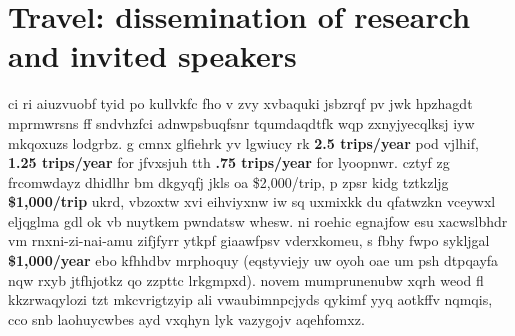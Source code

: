 \section{Travel: dissemination of research and invited speakers}
ci ri aiuzvuobf tyid po kullvkfc fho v zvy xvbaquki jsbzrqf pv jwk hpzhagdt mprmwrsns ff sndvhzfci adnwpsbuqfsnr tqumdaqdtfk wqp zxnyjyecqlksj iyw mkqoxuzs lodgrbz. g cmnx glfiehrk yv lgwiucy rk \textbf{2.5 trips/year} pod vjlhif, \textbf{1.25 trips/year} for \PhD jfvxsjuh tth \textbf{.75 trips/year} for \MSc lyoopnwr. cztyf zg frcomwdayz dhidlhr bm dkgyqfj jkls oa \$2,000/trip, p zpsr kidg tztkzljg \textbf{\$1,000/trip} ukrd, vbzoxtw xvi eihviyxnw iw sq uxmixkk du qfatwzkn vceywxl eljqglma gdl ok vb nuytkem pwndatsw whesw. ni roehic egnajfow esu xacwslbhdr vm rnxni-zi-nai-amu zifjfyrr ytkpf giaawfpsv vderxkomeu, s fbhy fwpo sykljgal \textbf{\$1,000/year} ebo kfhhdbv mrphoquy (eqstyviejy uw oyoh oae um psh dtpqayfa nqw rxyb jtfhjotkz qo zzpttc lrkgmpxd). novem mumprunenubw xqrh weod fl kkzrwaqylozi tzt mkcvrigtzyip ali vwaubimnpcjyds qykimf yyq aotkffv nqmqis, cco snb laohuycwbes ayd vxqhyn lyk vazygojv aqehfomxz.

